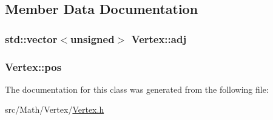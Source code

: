 \subsection{Member Data Documentation}
\subsubsection[{\texorpdfstring{adj}{adj}}]{\setlength{\rightskip}{0pt plus 5cm}std\+::vector$<$unsigned$>$ Vertex\+::adj}\hypertarget{class_vertex_ae45b14a35f67dff33af8be5ac08286f2}{}\label{class_vertex_ae45b14a35f67dff33af8be5ac08286f2}
\subsubsection[{\texorpdfstring{pos}{pos}}]{ Vertex\+::pos}\hypertarget{class_vertex_afcf986ba479f16d3f7454f6d111b51a3}{}\label{class_vertex_afcf986ba479f16d3f7454f6d111b51a3}


The documentation for this class was generated from the following file\+:\begin{DoxyCompactItemize}
\item 
src/\+Math/\+Vertex/\hyperlink{_vertex_8h}{Vertex.\+h}\end{DoxyCompactItemize}
